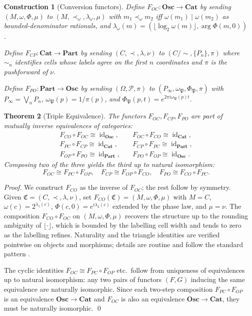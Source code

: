 \documentclass[twocolumn,a4paper]{article}
\newtheorem{theorem}{Theorem}[section]
\newtheorem{construction}[theorem]{Construction}
\DeclareMathOperator{\id}{id}
\newcommand{\CCat}{\mathfrak{C}}
\newcommand{\PPart}{\mathfrak{P}}
\begin{document}
\begin{construction}[Conversion functors]
\label{constr:functors}
Define $F_{OC}\colon\mathbf{Osc}\to\mathbf{Cat}$ by sending $(M,\omega,\Phi,\mu)$ to $(M,\prec_{\omega},\lambda_{\omega},\mu)$ with $m_{1}\prec_{\omega}m_{2}$ iff $\omega(m_{1})\mid\omega(m_{2})$ as bounded-denominator rationals, and $\lambda_{\omega}(m)=(\lfloor\log_{2}\omega(m)\rfloor,\arg\Phi(m,0))$.

Define $F_{CP}\colon\mathbf{Cat}\to\mathbf{Part}$ by sending $(C,\prec,\lambda,\nu)$ to $(C/{\sim},\{P_{n}\},\pi)$ where $\sim_{n}$ identifies cells whose labels agree on the first $n$ coordinates and $\pi$ is the pushforward of $\nu$.

Define $F_{PO}\colon\mathbf{Part}\to\mathbf{Osc}$ by sending $(\Omega,\mathscr{P},\pi)$ to $(P_{\infty},\omega_{\PPart},\Phi_{\PPart},\pi)$ with $P_{\infty}=\bigvee_{n}P_{n}$, $\omega_{\PPart}(p)=1/\pi(p)$, and $\Phi_{\PPart}(p,t)=e^{2\pi i\omega_{\PPart}(p)t}$.
\end{construction}

\begin{theorem}[Triple Equivalence]
\label{thm:triple-equiv}
The functors $F_{OC},F_{CP},F_{PO}$ are part of mutually inverse equivalences of categories:
\begin{align*}
F_{CO}\circ F_{OC}\cong\id_{\mathbf{Osc}}, &\quad F_{OC}\circ F_{CO}\cong\id_{\mathbf{Cat}},\\
F_{PC}\circ F_{CP}\cong\id_{\mathbf{Cat}}, &\quad F_{CP}\circ F_{PC}\cong\id_{\mathbf{Part}},\\
F_{OP}\circ F_{PO}\cong\id_{\mathbf{Part}}, &\quad F_{PO}\circ F_{OP}\cong\id_{\mathbf{Osc}}.
\end{align*}
Composing two of the three yields the third up to natural isomorphism:
\[
F_{OC}\cong F_{PC}\circ F_{OP},\quad
F_{CP}\cong F_{OP}\circ F_{CO},\quad
F_{PO}\cong F_{CO}\circ F_{PC}.
\]
\end{theorem}

\begin{proof}
We construct $F_{CO}$ as the inverse of $F_{OC}$; the rest follow by symmetry. Given $\CCat=(C,\prec,\lambda,\nu)$, set $F_{CO}(\CCat)=(M,\omega,\Phi,\mu)$ with $M=C$, $\omega(c)=2^{\lambda_{1}(c)}$, $\Phi(c,0)=e^{i\lambda_{2}(c)}$ extended by the phase law, and $\mu=\nu$. The composition $F_{CO}\circ F_{OC}$ on $(M,\omega,\Phi,\mu)$ recovers the structure up to the rounding ambiguity of $\lfloor\cdot\rfloor$, which is bounded by the labelling cell width and tends to zero as the labelling refines. Naturality and the triangle identities are verified pointwise on objects and morphisms; details are routine and follow the standard pattern \citep{maclane1998categories,borceux1994handbook}.

The cyclic identities $F_{OC}\cong F_{PC}\circ F_{OP}$ etc.\ follow from uniqueness of equivalences up to natural isomorphism: any two pairs of functors $(F,G)$ inducing the same equivalence are naturally isomorphic. Since each two-step composition $F_{PC}\circ F_{OP}$ is an equivalence $\mathbf{Osc}\to\mathbf{Cat}$ and $F_{OC}$ is also an equivalence $\mathbf{Osc}\to\mathbf{Cat}$, they must be naturally isomorphic. \qed
\end{proof}
\end{document}
